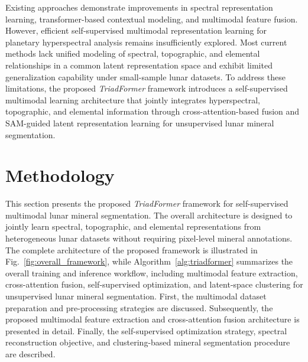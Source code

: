 \documentclass[pdflatex,sn-mathphys-num]{sn-jnl}
\begin{document}
Existing approaches demonstrate improvements in spectral representation learning, transformer-based contextual modeling, and multimodal feature fusion. However, efficient self-supervised multimodal representation learning for planetary hyperspectral analysis remains insufficiently explored. Most current methods lack unified modeling of spectral, topographic, and elemental relationships in a common latent representation space and exhibit limited generalization capability under small-sample lunar datasets. To address these limitations, the proposed \textit{TriadFormer} framework introduces a self-supervised multimodal learning architecture that jointly integrates hyperspectral, topographic, and elemental information through cross-attention-based fusion and SAM-guided latent representation learning for unsupervised lunar mineral segmentation.





\section{Methodology}

This section presents the proposed \textit{TriadFormer} framework for self-supervised multimodal lunar mineral segmentation. The overall architecture is designed to jointly learn spectral, topographic, and elemental representations from heterogeneous lunar datasets without requiring pixel-level mineral annotations. The complete architecture of the proposed framework is illustrated in Fig.~\ref{fig:overall_framework}, while Algorithm~\ref{alg:triadformer} summarizes the overall training and inference workflow, including multimodal feature extraction, cross-attention fusion, self-supervised optimization, and latent-space clustering for unsupervised lunar mineral segmentation. First, the multimodal dataset preparation and pre-processing strategies are discussed. Subsequently, the proposed multimodal feature extraction and cross-attention fusion architecture is presented in detail. Finally, the self-supervised optimization strategy, spectral reconstruction objective, and clustering-based mineral segmentation procedure are described.
\end{document}
